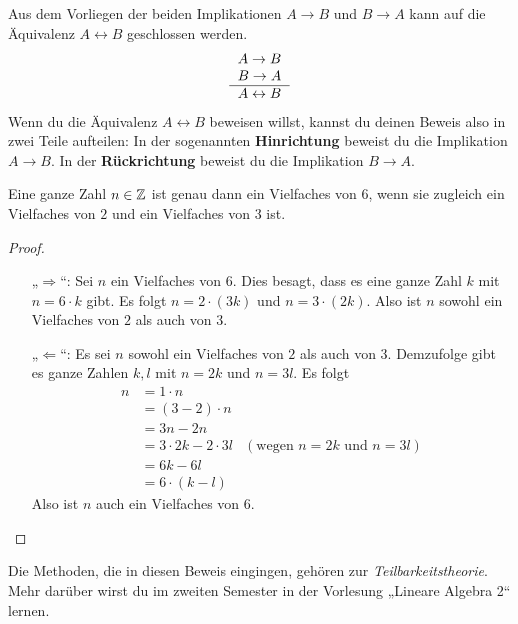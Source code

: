 \begin{axiom} \label{hinruck}   
    Aus dem Vorliegen der beiden Implikationen $A\to B$ und $B\to A$ kann auf die Äquivalenz $A\leftrightarrow B$ geschlossen werden.
    \[\begin{tabular}{r}
        $A\to B$ \\
        $B\to A$ \\
        \hline
        $A\leftrightarrow B$
    \end{tabular}\]
    Wenn du die Äquivalenz $A\leftrightarrow B$ beweisen willst, kannst du deinen Beweis also in zwei Teile aufteilen: In der sogenannten \textbf{Hinrichtung} beweist du die Implikation $A\to B$. In der \textbf{Rückrichtung} beweist du die Implikation $B\to A$.
\end{axiom}


\begin{bsp} \label{bsp:hinruck}
    Eine ganze Zahl $n\in \mathbb Z$ ist genau dann ein Vielfaches von $6$, wenn sie zugleich ein Vielfaches von $2$ und ein Vielfaches von $3$ ist.
\end{bsp}
\begin{proof}
    \begin{enumerate}
        \item[„$\Rightarrow$“:] Sei $n$ ein Vielfaches von $6$. Dies besagt, dass es eine ganze Zahl $k$ mit $n=6\cdot k$ gibt. Es folgt $n=2\cdot (3k)$ und $n=3\cdot (2k)$. Also ist $n$ sowohl ein Vielfaches von $2$ als auch von $3$.
        \item[„$\Leftarrow$“:] Es sei $n$ sowohl ein Vielfaches von $2$ als auch von $3$. Demzufolge gibt es ganze Zahlen $k,l$ mit $n=2k$ und $n=3l$. Es folgt
        \begin{align*}
            n & = 1\cdot n \\
            & = (3-2)\cdot n \\
            & = 3n - 2n \\
            & = 3\cdot 2k - 2\cdot 3l & (\text{wegen $n=2k$ und $n=3l$})\\
            & = 6k - 6l \\
            & = 6\cdot (k-l)
        \end{align*}
        Also ist $n$ auch ein Vielfaches von $6$. \qedhere
    \end{enumerate}
\end{proof}


\begin{bem}
    Die Methoden, die in diesen Beweis eingingen, gehören zur \emph{Teilbarkeitstheorie}. Mehr darüber wirst du im zweiten Semester in der Vorlesung „Lineare Algebra 2“ lernen.
\end{bem}


